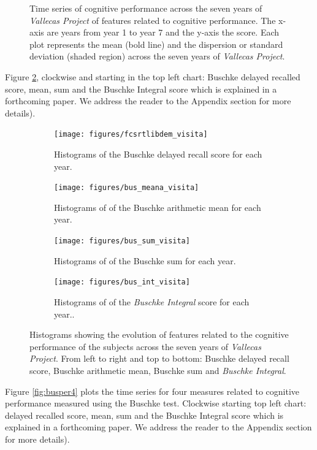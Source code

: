 \documentclass[11pt]{article}
\theoremstyle{definition}
\theoremstyle{remark}
\begin{document}
\begin{figure}[H]
    \caption{Time series of cognitive performance across the seven years of \emph{Vallecas Project} of features related to cognitive performance. The x-axis are years from year 1 to year 7 and the y-axis the score. Each plot represents the mean (bold line) and the dispersion or standard deviation (shaded region) across the seven years of \emph{Vallecas Project}.}
    \label{fig:cogper4}
\end{figure}


Figure \ref{fig:cogperyearsbus}, clockwise and starting in the top left chart: Buschke delayed recalled score, mean, sum and the Buschke Integral score which is explained in a forthcoming paper. We address the reader to the Appendix section for more details).

\begin{figure}[H]
    \centering
    \begin{subfigure}[t]{0.4\textwidth}
        \centering
        \texttt{[image: figures/fcsrtlibdem\_visita]}
        \caption{Histograms of the Buschke delayed recall score for each year.}
    \end{subfigure}
    \hfill
    \begin{subfigure}[t]{0.4\textwidth}
        \centering
        \texttt{[image: figures/bus\_meana\_visita]}
        \caption{Histograms of of the Buschke arithmetic mean for each year.}
    \end{subfigure}%
    
     \begin{subfigure}[t]{0.4\textwidth}
        \centering
        \texttt{[image: figures/bus\_sum\_visita]}
        \caption{Histograms of of the Buschke sum for each year.}
    \end{subfigure}
    \hfill
    \begin{subfigure}[t]{0.4\textwidth}
        \centering
        \texttt{[image: figures/bus\_int\_visita]}
        \caption{Histograms of of the \emph{Buschke Integral} score for each year..}
    \end{subfigure}%
   
    \caption{Histograms showing the evolution of features related to the cognitive performance of the subjects across the seven years of \emph{Vallecas Project}. From left to right and top to bottom: 
    Buschke delayed recall score, Buschke arithmetic mean, Buschke sum and \emph{Buschke Integral}.}
    \label{fig:cogperyearsbus}
\end{figure}


Figure \ref{fig:busper4} plots the time series for four measures related to cognitive performance measured using the Buschke test. Clockwise starting top left chart: delayed recalled score, mean, sum and the Buschke Integral score which is explained in a forthcoming paper. We address the reader to the Appendix section for more details).
\end{document}
